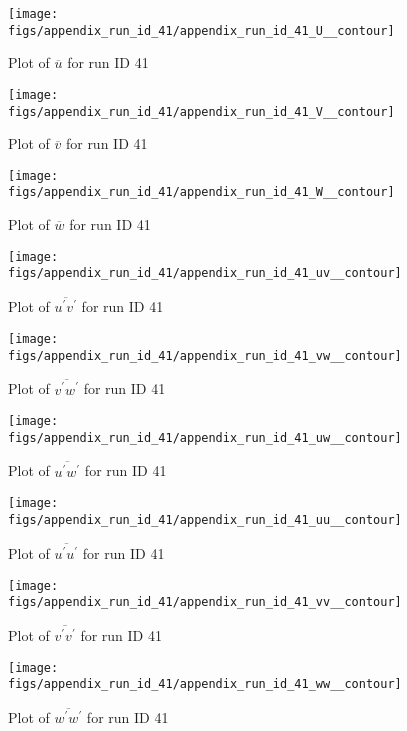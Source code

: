 \begin{figure}[H]
\centering
\texttt{[image: figs/appendix\_run\_id\_41/appendix\_run\_id\_41\_U\_\_contour]}
\caption{Plot of $\overline{u}$ for run ID 41}
\label{fig:appendix_run_id_41_U__contour}
\end{figure}


\begin{figure}[H]
\centering
\texttt{[image: figs/appendix\_run\_id\_41/appendix\_run\_id\_41\_V\_\_contour]}
\caption{Plot of $\overline{v}$ for run ID 41}
\label{fig:appendix_run_id_41_V__contour}
\end{figure}


\begin{figure}[H]
\centering
\texttt{[image: figs/appendix\_run\_id\_41/appendix\_run\_id\_41\_W\_\_contour]}
\caption{Plot of $\overline{w}$ for run ID 41}
\label{fig:appendix_run_id_41_W__contour}
\end{figure}


\begin{figure}[H]
\centering
\texttt{[image: figs/appendix\_run\_id\_41/appendix\_run\_id\_41\_uv\_\_contour]}
\caption{Plot of $\overline{u^\prime v^\prime}$ for run ID 41}
\label{fig:appendix_run_id_41_uv__contour}
\end{figure}


\begin{figure}[H]
\centering
\texttt{[image: figs/appendix\_run\_id\_41/appendix\_run\_id\_41\_vw\_\_contour]}
\caption{Plot of $\overline{v^\prime w^\prime}$ for run ID 41}
\label{fig:appendix_run_id_41_vw__contour}
\end{figure}


\begin{figure}[H]
\centering
\texttt{[image: figs/appendix\_run\_id\_41/appendix\_run\_id\_41\_uw\_\_contour]}
\caption{Plot of $\overline{u^\prime w^\prime}$ for run ID 41}
\label{fig:appendix_run_id_41_uw__contour}
\end{figure}


\begin{figure}[H]
\centering
\texttt{[image: figs/appendix\_run\_id\_41/appendix\_run\_id\_41\_uu\_\_contour]}
\caption{Plot of $\overline{u^\prime u^\prime}$ for run ID 41}
\label{fig:appendix_run_id_41_uu__contour}
\end{figure}


\begin{figure}[H]
\centering
\texttt{[image: figs/appendix\_run\_id\_41/appendix\_run\_id\_41\_vv\_\_contour]}
\caption{Plot of $\overline{v^\prime v^\prime}$ for run ID 41}
\label{fig:appendix_run_id_41_vv__contour}
\end{figure}


\begin{figure}[H]
\centering
\texttt{[image: figs/appendix\_run\_id\_41/appendix\_run\_id\_41\_ww\_\_contour]}
\caption{Plot of $\overline{w^\prime w^\prime}$ for run ID 41}
\label{fig:appendix_run_id_41_ww__contour}
\end{figure}


